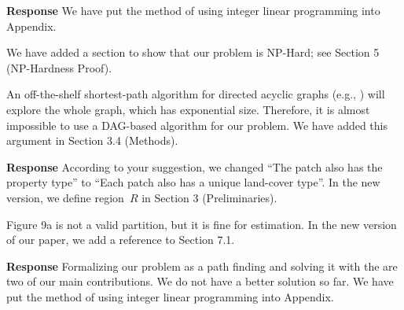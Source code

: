 \documentclass[a4paper,twoside,11pt]{reviewresponse}
\begin{document}
\textbf{Response}
We have put the method of using integer linear programming into Appendix.

We have added a section to show that our problem is NP-Hard;
see Section 5 (NP-Hardness Proof).

An off-the-shelf shortest-path algorithm for directed acyclic graphs
(e.g., \textcite[]{Cormen2009})
will explore the whole graph, which has exponential size.
Therefore, it is almost impossible to use a DAG-based algorithm
for our problem.
We have added this argument in Section 3.4 (Methods).




\textbf{Response} According to your suggestion, 
we changed ``The patch also has the property type''
to ``Each patch also has a unique land-cover type''.
In the new version, we define region~$R$ in Section 3 (Preliminaries).

Figure 9a is not a valid partition, but it is fine for estimation.
In the new version of our paper, we add a reference to Section 7.1.



\textbf{Response} Formalizing our problem as a path finding and solving it with the \Astar are two of our main contributions.
We do not have a better solution so far.
We have put the method of using integer linear programming into Appendix.
\end{document}
